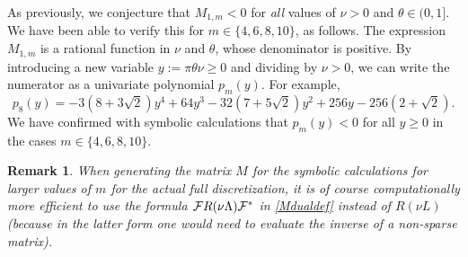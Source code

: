 \documentclass[smallextended,numbook,runningheads]{svjour3}     %
\newtheorem{remark}{Remark}
\newtheorem{remark}{Remark}
\newcommand{\cF}{{\cal{F}}}
\begin{document}
\begin{description}[style=unboxed,leftmargin=0cm]
%
%

As previously, we conjecture that $M_{1,m}<0$ for \emph{all} values of $\nu>0$ and $\theta\in(0,1]$.
We have been able to verify this for $m\in\{4,6,8,10\}$, as follows.
The expression $M_{1,m}$ is a rational function in $\nu$ and $\theta$, whose
denominator is positive. By introducing a new variable $y:=\pi\theta\nu\ge 0$
and dividing by $\nu>0$, we can write the numerator as a univariate polynomial 
$p_m(y)$.  For example,
$$p_8(y) = -3 \left(8+3 \sqrt{2}\right) y^4+64 y^3-32 \left(7+5 \sqrt{2}\right) y^2+256 y-256 \left(2+\sqrt{2}\right).$$
We have confirmed with symbolic calculations that $p_m(y)<0$
for all $y\ge 0$ in the cases $m\in\{4,6,8,10\}$. 
\begin{remark} 
When generating the matrix $M$ for the symbolic calculations for larger values of $m$ for the actual full discretization, it is of course computationally more efficient to use the formula $\cF R(\nu \Lambda) \cF^*$ in \eqref{Mdualdef} instead of $R(\nu L)$ (because in the latter form one would need to evaluate the inverse of a non-sparse matrix).
\end{remark} 


\end{description}
\end{document}
